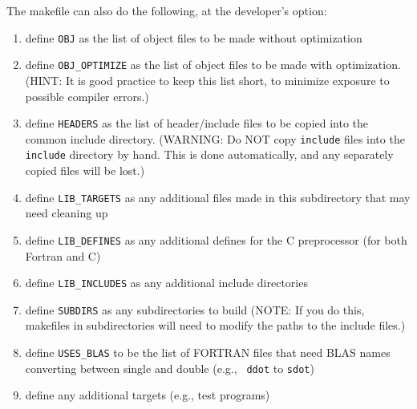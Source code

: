 The makefile can also do the following, at the developer's option:
\begin{enumerate}
\item define {\tt OBJ} as the list of object files to be made 
    without optimization
\item define {\tt OBJ\_OPTIMIZE} as the list of object files to 
    be made with optimization.  (HINT: It is good practice to keep this list 
    short, to minimize exposure to possible compiler errors.)
\item define {\tt HEADERS} as the list of header/include files to be
    copied into the common include directory.  (WARNING: Do NOT copy {\tt include} 
    files into the {\tt include} directory by hand.  This is done
    automatically, and any separately copied files will be lost.)
\item define {\tt LIB\_TARGETS} as any additional files made in
    this subdirectory that may need cleaning up
\item define {\tt LIB\_DEFINES} as any additional defines for
   the C preprocessor (for both Fortran and C)
 \item define {\tt LIB\_INCLUDES} as any additional include
   directories
\item  define {\tt SUBDIRS} as any subdirectories to build (NOTE: If you do this,
  makefiles in subdirectories will need to modify the paths to
  the include files.)
\item define {\tt USES\_BLAS} to be the list of FORTRAN files that
    need BLAS names converting between single and double (e.g., {\tt
      ddot} to  {\tt sdot})
\item define any additional targets (e.g., test programs)
\end{enumerate}

